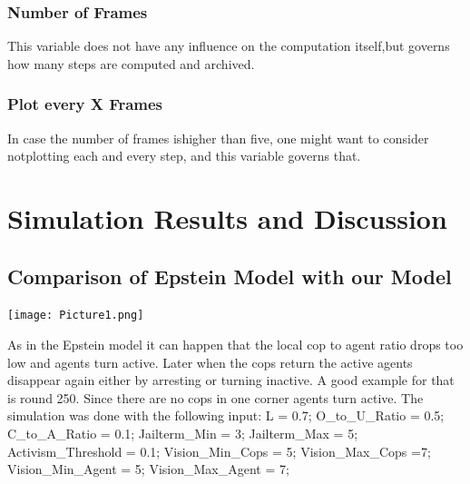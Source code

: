 \documentclass[11pt]{article}
\begin{document}
\subsubsection{Number of Frames}
This variable does not have any influence on the computation itself,but governs how many steps are computed and archived.

\subsubsection{Plot every X Frames}
In case the number of frames ishigher than five, one might want to consider notplotting each and every step, and this variable governs that.

\newpage

\section{Simulation Results and Discussion}


\subsection{Comparison of Epstein Model with our Model}

\texttt{[image: Picture1.png]}

As in the Epstein model it can happen that the local cop to agent ratio drops too low and agents turn active. Later when the cops return the active agents disappear again either by arresting or turning inactive.  A good example for that is round 250. Since there are no cops in one corner agents turn active. The simulation was done with the following input: \newline
L = 0.7;\newline
O\_to\_U\_Ratio = 0.5;     \newline
C\_to\_A\_Ratio = 0.1;      \newline
Jailterm\_Min = 3;          \newline
Jailterm\_Max = 5;          \newline
Activism\_Threshold = 0.1;\newline
Vision\_Min\_Cops = 5;\newline
Vision\_Max\_Cops =7;\newline
Vision\_Min\_Agent = 5;\newline
Vision\_Max\_Agent = 7;\newline
\end{document}
